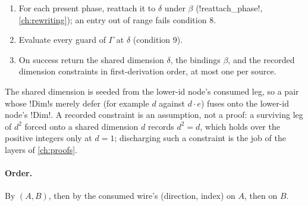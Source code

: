 \begin{algorithm}
\begin{enumerate}
\item For each present phase, reattach it to $\delta$ under $\beta$ (\py!reattach_phase!, \cref{ch:rewriting}); an entry out of range fails condition 8.
\item Evaluate every guard of $\Gamma$ at $\delta$ (condition 9).
\item On success return the shared dimension $\delta$, the bindings $\beta$, and the recorded dimension constraints in first-derivation order, at most one per source.
\end{enumerate}
\end{algorithm}

The shared dimension is seeded from the lower-id node's consumed leg, so a pair whose \py!Dim!s merely defer (for example $d$ against $d\cdot e$) fuses onto the lower-id node's \py!Dim!. A recorded constraint is an assumption, not a proof: a surviving leg of $d^2$ forced onto a shared dimension $d$ records $d^2=d$, which holds over the positive integers only at $d=1$; discharging such a constraint is the job of the layers of \cref{ch:proofs}.

\paragraph{Order.} By $(A, B)$, then by the consumed wire's (direction, index) on $A$, then on $B$.

